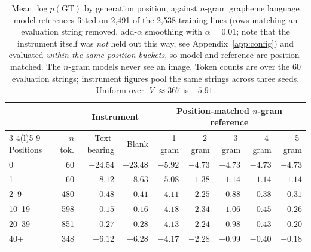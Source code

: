 \documentclass{article}
\begin{document}
\begin{table}[h]
\small
\centering
\caption{Mean $\log p(\mathrm{GT})$ by generation position, against $n$-gram grapheme language
model references fitted on 2{,}491 of the 2{,}538 training lines (rows matching an evaluation
string removed, add-$\alpha$ smoothing with $\alpha = 0.01$; note that the instrument itself was
\emph{not} held out this way, see Appendix~\ref{app:config}) and evaluated \emph{within the same position
buckets}, so model and reference are position-matched. The $n$-gram models never see an image.
Token counts are over the 60 evaluation strings; instrument figures pool the same strings across
three seeds. Uniform over $|V|\approx367$ is $-5.91$.}
\label{tab:position}
\setlength{\tabcolsep}{4pt}
\begin{tabular}{lrrr@{\hskip 12pt}rrrrr}
\toprule
 & & \multicolumn{2}{c}{Instrument} & \multicolumn{5}{c}{Position-matched $n$-gram reference} \\
\cmidrule(lr){3-4}\cmidrule(l){5-9}
Positions & $n$ tok. & Text-bearing & Blank & 1-gram & 2-gram & 3-gram & 4-gram & 5-gram \\
\midrule
0      & 60  & $\mathbf{-24.54}$ & $-23.48$ & $-5.92$ & $-4.73$ & $-4.73$ & $-4.73$ & $-4.73$ \\
1      & 60  & $\mathbf{-8.12}$  & $-8.63$  & $-5.08$ & $-1.38$ & $-1.14$ & $-1.14$ & $-1.14$ \\
2--9   & 480 & $-0.48$ & $-0.41$ & $-4.11$ & $-2.25$ & $-0.88$ & $-0.38$ & $-0.31$ \\
10--19 & 598 & $-0.15$ & $-0.16$ & $-4.18$ & $-2.34$ & $-1.06$ & $-0.45$ & $-0.26$ \\
20--39 & 851 & $-0.27$ & $-0.28$ & $-4.13$ & $-2.24$ & $-0.98$ & $-0.43$ & $-0.20$ \\
40+    & 348 & $\mathbf{-6.12}$  & $-6.28$  & $-4.17$ & $-2.28$ & $-0.99$ & $-0.40$ & $-0.18$ \\
\bottomrule
\end{tabular}
\end{table}
\end{document}
